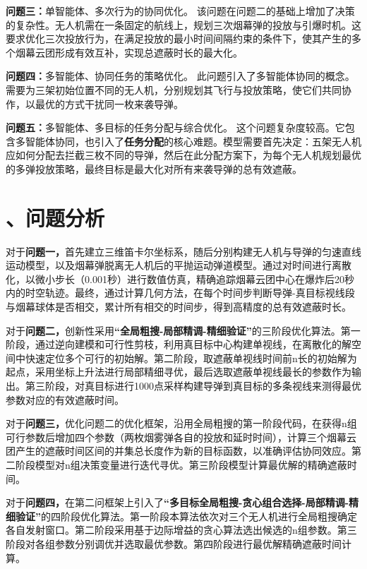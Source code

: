 \documentclass[12pt]{article}
\begin{document}
\begin{CJK}{UTF8}{gbsn}
		\textbf{问题三：}单智能体、多次行为的协同优化。
		该问题在问题二的基础上增加了决策的复杂性。无人机需在一条固定的航线上，规划三次烟幕弹的投放与引爆时机。这要求优化三次投放行为，在满足投放的最小时间间隔约束的条件下，使其产生的多个烟幕云团形成有效互补，实现总遮蔽时长的最大化。
		
		\textbf{问题四：}多智能体、协同任务的策略优化。
		此问题引入了多智能体协同的概念。需要为三架初始位置不同的无人机，分别规划其飞行与投放策略，使它们共同协作，以最优的方式干扰同一枚来袭导弹。
		
		\textbf{问题五：}多智能体、多目标的任务分配与综合优化。
		这个问题复杂度较高。它包含多智能体协同，也引入了\textbf{任务分配}的核心难题。模型需要首先决定：五架无人机应如何分配去拦截三枚不同的导弹，然后在此分配方案下，为每个无人机规划最优的多弹投放策略，最终目标是最大化对所有来袭导弹的总有效遮蔽。
		
		\section{、问题分析}
		
		
		对于\textbf{问题一，}首先建立三维笛卡尔坐标系，随后分别构建无人机与导弹的匀速直线运动模型，以及烟幕弹脱离无人机后的平抛运动弹道模型。通过对时间进行离散化，以微小步长（0.001秒）进行数值仿真，精确追踪烟幕云团中心在爆炸后20秒内的时空轨迹。最终，通过计算几何方法，在每个时间步判断导弹-真目标视线段与烟幕球体是否相交，累计所有相交的时间步，得到高精度的总有效遮蔽时长。
		
		对于\textbf{问题二，}创新性采用\textbf{“全局粗搜-局部精调-精细验证”}的三阶段优化算法。第一阶段，通过逆向建模和可行性剪枝，利用真目标中心构建单视线，在离散化的解空间中快速定位多个可行的初始解。第二阶段，取遮蔽单视线时间前n长的初始解为起点，采用坐标上升法进行局部精细寻优，最后选取遮蔽单视线最长的参数作为输出。第三阶段，对真目标进行1000点采样构建导弹到真目标的多条视线来测得最优参数对应的有效遮蔽时间。
		
		对于\textbf{问题三，}优化问题二的优化框架，沿用全局粗搜的第一阶段代码，在获得n组可行参数后增加四个参数（两枚烟雾弹各自的投放和延时时间），计算三个烟幕云团产生的遮蔽时间区间的并集总长度作为新的目标函数，以准确评估协同效应。第二阶段模型对n组决策变量进行迭代寻优。第三阶段模型计算最优解的精确遮蔽时间。
		
		对于\textbf{问题四，}在第二问框架上引入了\textbf{“多目标全局粗搜-贪心组合选择-局部精调-精细验证”}的四阶段优化算法。第一阶段本算法依次对三个无人机进行全局粗搜确定各自发射窗口。第二阶段采用基于边际增益的贪心算法选出候选的n组参数。第三阶段对各组参数分别调优并选取最优参数。第四阶段进行最优解精确遮蔽时间计算。
		

\end{CJK}
\end{document}

